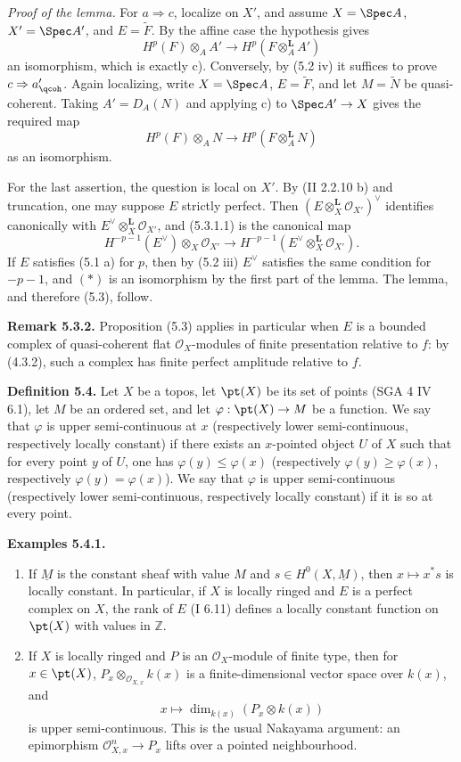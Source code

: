 \emph{Proof of the lemma.} For \(a\Rightarrow c\), localize on \(X'\), and assume \(X=\Spec A\), \(X'=\Spec A'\), and \(E=\widetilde F\). By the affine case the hypothesis gives
\[
 H^p(F)\otimes_AA'
 \longrightarrow
 H^p(F\otimes_A^{\mathbf L}A')
\]
an isomorphism, which is exactly c). Conversely, by (5.2 iv) it suffices to prove \(c\Rightarrow a'_{\qcoh}\). Again localizing, write \(X=\Spec A\), \(E=\widetilde F\), and let \(M=\widetilde N\) be quasi-coherent. Taking \(A'=D_A(N)\) and applying c) to \(\Spec A'\to X\) gives the required map
\[
 H^p(F)\otimes_AN
 \longrightarrow
 H^p(F\otimes_A^{\mathbf L}N)
\]
as an isomorphism.

For the last assertion, the question is local on \(X'\). By (II 2.2.10 b) and truncation, one may suppose \(E\) strictly perfect. Then \((E\otimes_X^{\mathbf L}\mathcal O_{X'})^{\vee}\) identifies canonically with \(E^{\vee}\otimes_X^{\mathbf L}\mathcal O_{X'}\), and (5.3.1.1) is the canonical map
\[
 H^{-p-1}(E^{\vee})\otimes_X\mathcal O_{X'}
 \longrightarrow
 H^{-p-1}(E^{\vee}\otimes_X^{\mathbf L}\mathcal O_{X'}).
\tag{*}
\]
If \(E\) satisfies (5.1 a) for \(p\), then by (5.2 iii) \(E^{\vee}\) satisfies the same condition for \(-p-1\), and \((*)\) is an isomorphism by the first part of the lemma. The lemma, and therefore (5.3), follow.

\textbf{Remark 5.3.2.} Proposition (5.3) applies in particular when \(E\) is a bounded complex of quasi-coherent flat \(\mathcal O_X\)-modules of finite presentation relative to \(f\): by (4.3.2), such a complex has finite perfect amplitude relative to \(f\).

\textbf{Definition 5.4.} Let \(X\) be a topos, let \(\pt(X)\) be its set of points (SGA 4 IV 6.1), let \(M\) be an ordered set, and let \(\varphi:\pt(X)\to M\) be a function. We say that \(\varphi\) is upper semi-continuous at \(x\) (respectively lower semi-continuous, respectively locally constant) if there exists an \(x\)-pointed object \(U\) of \(X\) such that for every point \(y\) of \(U\), one has \(\varphi(y)\leq\varphi(x)\) (respectively \(\varphi(y)\geq\varphi(x)\), respectively \(\varphi(y)=\varphi(x)\)). We say that \(\varphi\) is upper semi-continuous (respectively lower semi-continuous, respectively locally constant) if it is so at every point.

\textbf{Examples 5.4.1.}
\begin{enumerate}[label=\alph*)]
\item If \(\underline M\) is the constant sheaf with value \(M\) and \(s\in H^0(X,\underline M)\), then \(x\mapsto x^*s\) is locally constant. In particular, if \(X\) is locally ringed and \(E\) is a perfect complex on \(X\), the rank of \(E\) (I 6.11) defines a locally constant function on \(\pt(X)\) with values in \(\mathbb Z\).
\item If \(X\) is locally ringed and \(P\) is an \(\mathcal O_X\)-module of finite type, then for \(x\in\pt(X)\), \(P_x\otimes_{\mathcal O_{X,x}}k(x)\) is a finite-dimensional vector space over \(k(x)\), and
\[
 x\longmapsto \dim_{k(x)}(P_x\otimes k(x))
\]
is upper semi-continuous. This is the usual Nakayama argument: an epimorphism \(\mathcal O_{X,x}^{n}\to P_x\) lifts over a pointed neighbourhood.
\end{enumerate}

